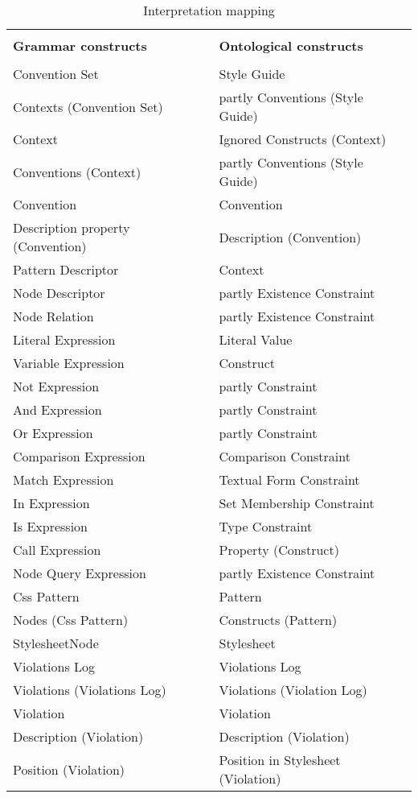 \begin{table}[t]
\begin{center}
\begin{longtable}{ | p{20em} | p{20em} | } 
\hline
 &  \\
\textbf{Grammar constructs} & \textbf{Ontological constructs}  \\
 &  \\
\hline

Convention Set & Style Guide \\ \hline
Contexts (Convention Set) & partly Conventions (Style Guide) \\ \hline
Context & Ignored Constructs (Context) \\ \hline
Conventions (Context) & partly Conventions (Style Guide) \\ \hline
Convention & Convention \\ \hline
Description property (Convention) & Description (Convention) \\ \hline
Pattern Descriptor & Context \\ \hline
Node Descriptor & partly Existence Constraint \\ \hline
Node Relation & partly Existence Constraint \\ \hline

Literal Expression & Literal Value \\ \hline
Variable Expression & Construct \\ \hline
Not Expression & partly Constraint \\ \hline
And Expression & partly Constraint \\ \hline
Or Expression & partly Constraint \\ \hline
Comparison Expression & Comparison Constraint \\ \hline
Match Expression & Textual Form Constraint \\ \hline
In Expression & Set Membership Constraint \\ \hline
Is Expression & Type Constraint \\ \hline
Call Expression & Property (Construct) \\ \hline
Node Query Expression & partly Existence Constraint \\ \hline

Css Pattern & Pattern \\ \hline
Nodes (Css Pattern) & Constructs (Pattern) \\ \hline
StylesheetNode & Stylesheet \\ \hline
Violations Log & Violations Log \\ \hline
Violations (Violations Log) & Violations (Violation Log) \\ \hline
Violation & Violation \\ \hline
Description (Violation) & Description (Violation) \\ \hline
Position (Violation) & Position in Stylesheet (Violation) \\ \hline
\end{longtable}
\end{center}
\caption{
	\label{tab:interpretation}
	Interpretation mapping}
\end{table}